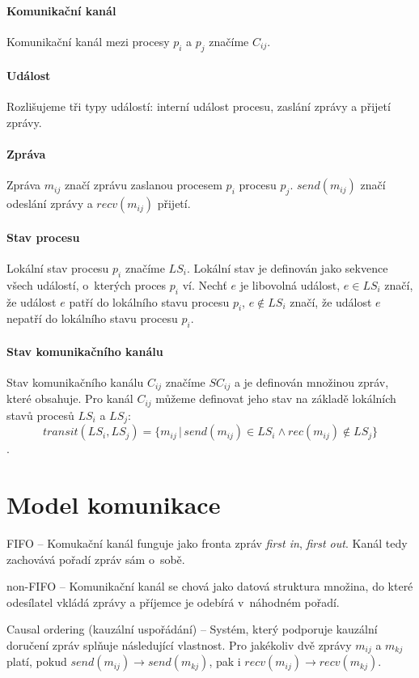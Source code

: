 \paragraph*{Komunikační kanál} Komunikační kanál mezi procesy $p_i$ a $p_j$ značíme $C_{ij}$.

\paragraph*{Událost} Rozlišujeme tři typy událostí: interní událost procesu, zaslání zprávy a přijetí zprávy.

\paragraph*{Zpráva} Zpráva $m_{ij}$ značí zprávu zaslanou procesem $p_i$ procesu $p_j$. $send(m_{ij})$ značí odeslání zprávy a $recv(m_{ij})$ přijetí.

\paragraph*{Stav procesu} Lokální stav procesu $p_i$ značíme $LS_i$. Lokální stav je definován jako sekvence všech událostí, o~kterých proces $p_i$ ví. Nechť $e$ je libovolná událost, $e \in LS_i$ značí, že událost $e$ patří do lokálního stavu procesu $p_i$, $e \not\in LS_i$ značí, že událost $e$ nepatří do lokálního stavu procesu $p_i$.

\paragraph*{Stav komunikačního kanálu} Stav komunikačního kanálu $C_{ij}$ značíme $SC_{ij}$ a je definován množinou zpráv, které obsahuje. Pro kanál $C_{ij}$ můžeme definovat jeho stav na základě lokálních stavů procesů $LS_i$ a $LS_j$: $$
transit(LS_i, LS_j) = \{ m_{ij} \,|\, send(m_{ij}) \in LS_i \land rec(m_{ij}) \not\in LS_j \}
$$.

\section{Model komunikace}

\begin{compactitem}
    \item FIFO -- Komukační kanál funguje jako fronta zpráv \textit{first in}, \textit{first out}. Kanál tedy zachovává pořadí zpráv sám o~sobě.

    \item non-FIFO -- Komunikační kanál se chová jako datová struktura množina, do které odesílatel vkládá zprávy a příjemce je odebírá v~náhodném pořadí.

    \item Causal ordering (kauzální uspořádání) -- Systém, který podporuje kauzální doručení zpráv splňuje následující vlastnost. Pro jakékoliv dvě zprávy $m_{ij}$ a $m_{kj}$ platí, pokud $send(m_{ij}) \rightarrow send(m_{kj})$, pak i $recv(m_{ij}) \rightarrow recv(m_{kj})$.
\end{compactitem}

